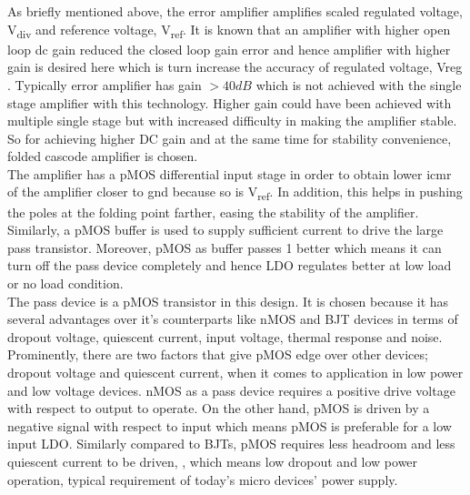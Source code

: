 \documentclass[12pt,a4paper,UKenglish]{article}
\begin{document}
As briefly mentioned above, the error amplifier amplifies scaled regulated voltage, V\textsubscript{div} and reference voltage, V\textsubscript{ref}. It is known that an amplifier with higher open loop \acrshort{dc} gain reduced the closed loop gain error and hence amplifier with higher gain is desired here which is turn increase the accuracy of regulated voltage, Vreg \cite{ldo_bulkmod}. Typically error amplifier has gain $> 40 dB$ which is not achieved with the single stage amplifier with this technology. Higher gain could have been achieved with multiple single stage but with increased difficulty in making the amplifier stable. So for achieving higher DC gain and at the same time for stability convenience, folded cascode amplifier \cite[pp. xx]{razavi_2001} is chosen. \\

The amplifier has a pMOS differential input stage in order to obtain lower \acrshort{icmr} of the amplifier closer to gnd because so is V\textsubscript{ref}. In addition, this helps in pushing the poles at the folding point farther, easing the stability of the amplifier\cite[pp. 304-305]{razavi_2001}. Similarly, a pMOS buffer is used to supply sufficient current to drive the large pass transistor.  Moreover, pMOS as buffer passes 1 better which means it can turn off the pass device completely and hence LDO regulates better at low load or no load condition. \\

The pass device is a pMOS transistor in this design. It is chosen because it has several advantages over it's counterparts like nMOS and BJT devices in terms of dropout voltage, quiescent current, input voltage, thermal response and noise\cite{ldo_ti_pmos}. Prominently, there are two factors that give pMOS edge over other devices; dropout voltage and quiescent current, when it comes to application in low power and low voltage devices. nMOS as a pass device requires a positive drive voltage with respect to output to operate. On the other hand, pMOS is driven by a negative signal with respect to input which means pMOS is preferable for a low input LDO. Similarly compared to BJTs, pMOS requires less headroom and less quiescent current to be driven\cite{ldo_ti_pmos}, \cite{ldo_ti_stability}, which means low dropout and low power operation, typical requirement of today's micro devices' power supply. \\
\end{document}
